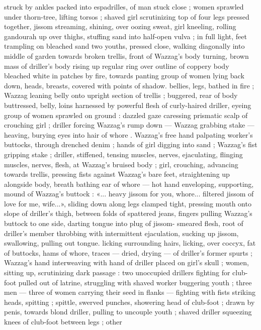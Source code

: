 struck by ankles packed into espadrilles, of man stuck close ; women
sprawled under thorn-tree, lifting torsos ; shaved girl scrutinizing top
of four legs pressed together, jissom streaming, shining, over oozing
sweat, girl kneeling, rolling gandourah up over thighs, stuffing sand
into half-open vulva ; in full light, feet trampling on bleached sand
two youths, pressed close, walking diagonally into middle of garden
towards broken trellis, front of Wazzag's body turning, brown mass
of driller's body rising up regular ring over outline of coppery body
bleached white in patches by fire, towards panting group of women
lying back down, heads, breasts, covered with points of shadow.
bellies, legs, bathed in fire ; Wazzag leaning belly onto upright
section of trellis ; buggered, rear of body buttressed, belly, loins
harnessed by powerful flesh of curly-haired driller, eyeing group of
women sprawled on ground : dazzled gaze caressing prismatic scalp
of crouching girl ; driller forcing Wazzag's rump down --- Wazzag
grabbing stake --- heaving, burying eyes into hair of whore .
Wazzag's free hand palpating worker's buttocks, through drenched
denim ; hands of girl digging into sand ; Wazzag's fist gripping stake
; driller, stiffened, tensing muscles, nerves, ejaculating, flinging
muscles, nerves, flesh, at Wazzag's bruised body ; girl, crouching,
advancing towards trellis, pressing fists against Wazzag's bare feet,
straightening up alongside body, breath bathing ear of whore --- hot
hand enveloping, supporting, mound of Wazzag’s buttock : «... heavy
jissom for you, whore... filtered jissom of love for me, wife...», sliding
down along legs clamped tight, pressing mouth onto slope of
driller's thigh, between folds of spattered jeans, fingers pulling
Wazzag's buttock to one side, darting tongue into plug of jissom-
smeared flesh, root of driller's member throbbing with intermittent
ejaculation, sucking up jissom, swallowing, pulling out tongue. licking
surrounding hairs, licking, over coccyx, fat of buttocks, hams of
whore, traces --- dried, drying --- of driller's former spurts ;
Wazzag's hand interweaving with hand of driller placed on girl's skull
; women, sitting up, scrutinizing dark passage : two unoccupied
drillers fighting for club-foot pulled out of latrine, struggling with
shaved worker buggering youth ; three men --- three of women
carrying their seed in flanks --- fighting with fists striking heads,
spitting ; spittle, swerved punches, showering head of club-foot ;
drawn by penis, towards blond driller, pulling to uncouple youth ;
shaved driller squeezing knees of club-foot between legs ; other
